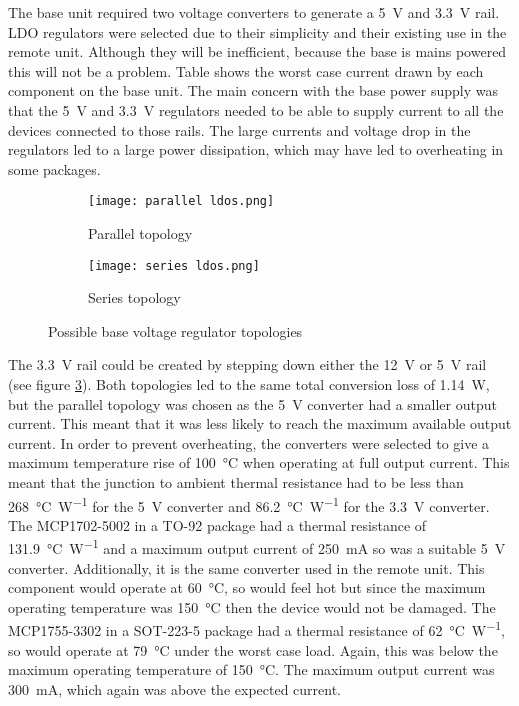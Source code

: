 The base unit required two voltage converters to generate a \SI{5}{\volt} and \SI{3.3}{\volt} rail. LDO regulators were selected due to their simplicity and their existing use in the remote unit. Although they will be inefficient, because the base is mains powered this will not be a problem. Table \label{fig: base current} shows the worst case current drawn by each component on the base unit. The main concern with the base power supply was that the \SI{5}{\volt} and \SI{3.3}{\volt} regulators needed to be able to supply current to all the devices connected to those rails. The large currents and voltage drop in the regulators led to a large power dissipation, which may have led to overheating in some packages.\\

\begin{figure}[htbp]
	\centering
	\begin{subfigure}[b]{0.35\linewidth}
		\texttt{[image: parallel ldos.png]}
		\caption{Parallel topology}
		\label{fig: parallel ldos}
	\end{subfigure}
	\begin{subfigure}[b]{0.5\linewidth}
		\texttt{[image: series ldos.png]}
		\caption{Series topology}
		\label{fig: series ldos}
	\end{subfigure}
	\caption{Possible base voltage regulator topologies}
	\label{fig: base ldos}
\end{figure}

The \SI{3.3}{\volt} rail could be created by stepping down either the \SI{12}{\volt} or \SI{5}{\volt} rail (see figure \ref{fig: base ldos}). Both topologies led to the same total conversion loss of \SI{1.14}{\watt}, but the parallel topology was chosen as the \SI{5}{\volt} converter had a smaller output current. This meant that it was less likely to reach the maximum available output current. In order to prevent overheating, the converters were selected to give a maximum temperature rise of \SI{100}{\celsius} when operating at full output current. This meant that the junction to ambient thermal resistance had to be less than \SI{268}{\celsius\per\watt} for the \SI{5}{\volt} converter and \SI{86.2}{\celsius\per\watt} for the \SI{3.3}{\volt} converter. The MCP1702-5002 \cite{mcp1702} in a TO-92 package had a thermal resistance of \SI{131.9}{\celsius\per\watt} and a maximum output current of \SI{250}{\milli\ampere} so was a suitable \SI{5}{\volt} converter. Additionally, it is the same converter used in the remote unit. This component would operate at \SI{60}{\celsius}, so would feel hot but since the maximum operating temperature was \SI{150}{\celsius} then the device would not be damaged. The MCP1755-3302 \cite{mcp1755} in a SOT-223-5 package had a thermal resistance of \SI{62}{\celsius\per\watt}, so would operate at \SI{79}{\celsius} under the worst case load. Again, this was below the maximum operating temperature of \SI{150}{\celsius}. The maximum output current was \SI{300}{\milli\ampere}, which again was above the expected current.\\

